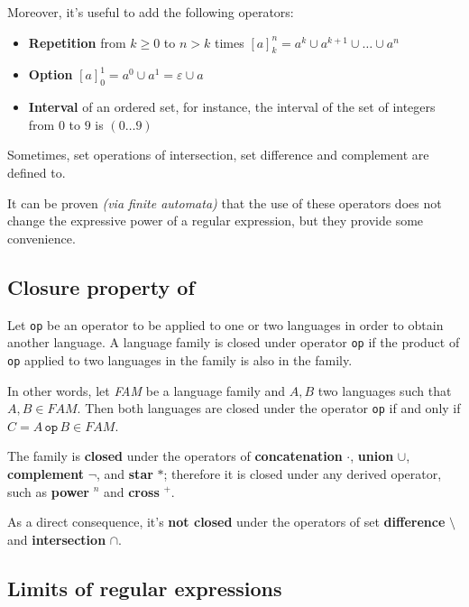 \documentclass[english]{article}
\begin{document}
Moreover, it's useful to add the following operators:

\begin{itemize}
  \item \textbf{Repetition} from \(k \geq 0\) to \(n > k\) times \([a]^n_k = a^k \cup a^{k+1} \cup \ldots \cup a^n\)
  \item \textbf{Option} \([a]^1_0 = a^0 \cup a^1 = \varepsilon \cup a\)
  \item \textbf{Interval} of an ordered set, for instance, the interval of the set of integers from \(0\) to \(9\) is \((0 \ldots 9)\)
\end{itemize}

Sometimes, set operations of intersection, set difference and complement are defined to.

\bigskip
It can be proven \textit{(via finite automata)} that the use of these operators does not change the expressive power of a regular expression, but they provide some convenience.

\subsection{Closure property of \REG}
\label{sec:closure-of-regular-expressions}

Let \texttt{op} be an operator to be applied to one or two languages in order to obtain another language.
A language family is closed under operator \texttt{op} if the product of \texttt{op} applied to two languages in the family is also in the family.

In other words, let \textit{FAM} be a language family and \(A, B\) two languages such that \(A, B \in FAM\).
Then both languages are closed under the operator \texttt{op} if and only if \(C = A \, \texttt{op} \, B \in FAM\).

\bigskip
The family \REG is \textbf{closed} under the operators of \textbf{concatenation} \(\cdot\), \textbf{union} \(\cup\), \textbf{complement} \(\lnot\), and \textbf{star} \(\ast\);
therefore it is closed under any derived operator, such as \textbf{power} \(^n\) and \textbf{cross} \(^+\).

As a direct consequence, it's \textbf{not closed} under the operators of set \textbf{difference} \(\setminus\) and \textbf{intersection} \(\cap\).

\subsection{Limits of regular expressions}
\end{document}
